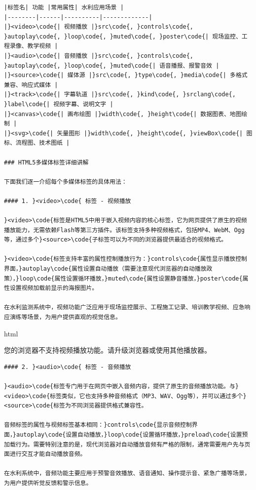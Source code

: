 \begin{lstlisting}
|标签名| 功能 |常用属性| 水利应用场景 |
|--------|------|----------|-------------|
|}<video>\code{| 视频播放 |}src\code{, }controls\code{, }autoplay\code{, }loop\code{, }muted\code{, }poster\code{| 现场监控、工程录像、教学视频 |
|}<audio>\code{| 音频播放 |}src\code{, }controls\code{, }autoplay\code{, }loop\code{, }muted\code{| 语音播报、报警音效 |
|}<source>\code{| 媒体源 |}src\code{, }type\code{, }media\code{| 多格式兼容、响应式媒体 |
|}<track>\code{| 字幕轨道 |}src\code{, }kind\code{, }srclang\code{, }label\code{| 视频字幕、说明文字 |
|}<canvas>\code{| 画布绘图 |}width\code{, }height\code{| 数据图表、地图绘制 |
|}<svg>\code{| 矢量图形 |}width\code{, }height\code{, }viewBox\code{| 图标、流程图、技术图纸 |

### HTML5多媒体标签详细讲解

下面我们逐一介绍每个多媒体标签的具体用法：

#### 1. }<video>\code{ 标签 - 视频播放

}<video>\code{标签是HTML5中用于嵌入视频内容的核心标签，它为网页提供了原生的视频播放能力，无需依赖Flash等第三方插件。该标签支持多种视频格式，包括MP4、WebM、Ogg等，通过多个}<source>\code{子标签可以为不同的浏览器提供最适合的视频格式。

}<video>\code{标签支持丰富的属性控制播放行为：}controls\code{属性显示播放控制界面，}autoplay\code{属性设置自动播放（需要注意现代浏览器的自动播放政策），}loop\code{属性设置循环播放，}muted\code{属性设置静音播放，}poster\code{属性设置视频加载前显示的海报图片。

在水利监测系统中，视频功能广泛应用于现场监控展示、工程施工记录、培训教学视频、应急响应演练等场景，为用户提供直观的视觉信息。

\end{lstlisting}

html

您的浏览器不支持视频播放功能。请升级浏览器或使用其他播放器。

\begin{lstlisting}
#### 2. }<audio>\code{ 标签 - 音频播放

}<audio>\code{标签专门用于在网页中嵌入音频内容，提供了原生的音频播放功能。与}<video>\code{标签类似，它也支持多种音频格式（MP3、WAV、Ogg等），并可以通过多个}<source>\code{标签为不同浏览器提供格式兼容性。

音频标签的属性与视频标签基本相同：}controls\code{显示音频控制界面，}autoplay\code{设置自动播放，}loop\code{设置循环播放，}preload\code{设置预加载行为。需要特别注意的是，现代浏览器对自动播放音频有严格的限制，通常需要用户先与页面进行交互才能自动播放音频。

在水利系统中，音频功能主要应用于预警音效播放、语音通知、操作提示音、紧急广播等场景，为用户提供听觉反馈和警示信息。

\end{lstlisting}

